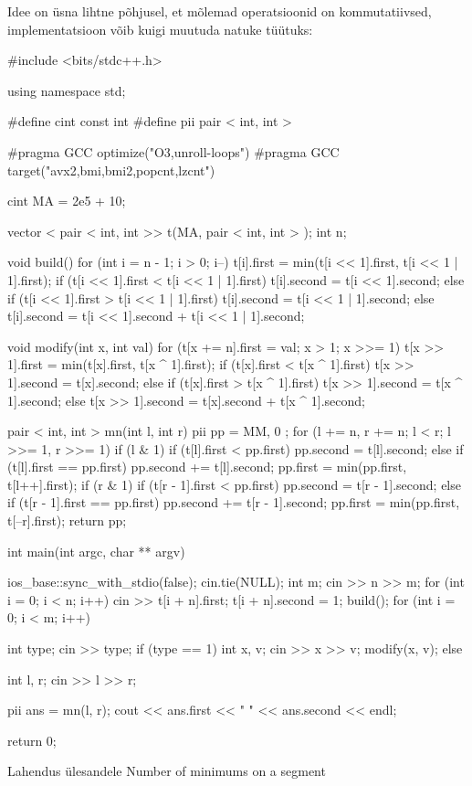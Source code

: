 \documentclass{trkut}
\theoremstyle{definition}
\begin{document}
Idee on üsna lihtne põhjusel, et mõlemad operatsioonid on kommutatiivsed, implementatsioon võib kuigi muutuda natuke tüütuks:
\begin{cclol}
#include <bits/stdc++.h>

using namespace std;

#define cint
const int
#define pii pair < int, int >

#pragma GCC optimize("O3,unroll-loops")
#pragma GCC target("avx2,bmi,bmi2,popcnt,lzcnt")

cint MA = 2e5 + 10;

vector < pair < int, int >> t(MA, pair < int, int > {});
int n;

void build() {
  for (int i = n - 1; i > 0; i--) {
    t[i].first = min(t[i << 1].first, t[i << 1 | 1].first);
    if (t[i << 1].first < t[i << 1 | 1].first) {
      t[i].second = t[i << 1].second;
    } else if (t[i << 1].first > t[i << 1 | 1].first) {
      t[i].second = t[i << 1 | 1].second;
    } else {
      t[i].second = t[i << 1].second + t[i << 1 | 1].second;
    }
  }
}

void modify(int x, int val) {
  for (t[x += n].first = val; x > 1; x >>= 1) {
    t[x >> 1].first = min(t[x].first, t[x ^ 1].first);
    if (t[x].first < t[x ^ 1].first) {
      t[x >> 1].second = t[x].second;
    } else if (t[x].first > t[x ^ 1].first) {
      t[x >> 1].second = t[x ^ 1].second;
    } else {
      t[x >> 1].second = t[x].second + t[x ^ 1].second;
    }
  }
}

pair < int, int > mn(int l, int r) {
  pii pp = {
    MM,
    0
  };
  for (l += n, r += n; l < r; l >>= 1, r >>= 1) {
    if (l & 1) {
    if (t[l].first < pp.first) pp.second = t[l].second;
    else if (t[l].first == pp.first) pp.second += t[l].second;
    pp.first = min(pp.first, t[l++].first);
    }
    if (r & 1) {
    if (t[r - 1].first < pp.first) pp.second = t[r - 1].second;
    else if (t[r - 1].first == pp.first) pp.second += t[r - 1].second;
    pp.first = min(pp.first, t[--r].first);
    }
  }
  return pp;
}

int main(int argc, char ** argv) {
  ios_base::sync_with_stdio(false);
  cin.tie(NULL);
  int m;
  cin >> n >> m;
  for (int i = 0; i < n; i++) {
    cin >> t[i + n].first;
    t[i + n].second = 1;
  }
  build();
  for (int i = 0; i < m; i++) {
    int type;
    cin >> type;
    if (type == 1) {
      int x, v;
      cin >> x >> v;
      modify(x, v);
    } else {
      int l, r;
      cin >> l >> r;

      pii ans = mn(l, r);
      cout << ans.first << " " << ans.second << endl;
    }
  }

  return 0;
}
    \end{cclol}
    \begin{kk}[H]
    \caption{Lahendus ülesandele Number of minimums on a segment}%
    \end{kk}
\end{document}
